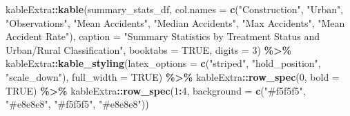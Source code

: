 \documentclass[
]{article}
\newenvironment{Shaded}{\begin{snugshade}}{\end{snugshade}}
\newcommand{\AttributeTok}[1]{\textcolor[rgb]{0.13,0.29,0.53}{#1}}
\newcommand{\ConstantTok}[1]{\textcolor[rgb]{0.56,0.35,0.01}{#1}}
\newcommand{\DecValTok}[1]{\textcolor[rgb]{0.00,0.00,0.81}{#1}}
\newcommand{\FunctionTok}[1]{\textcolor[rgb]{0.13,0.29,0.53}{\textbf{#1}}}
\newcommand{\NormalTok}[1]{#1}
\newcommand{\SpecialCharTok}[1]{\textcolor[rgb]{0.81,0.36,0.00}{\textbf{#1}}}
\newcommand{\StringTok}[1]{\textcolor[rgb]{0.31,0.60,0.02}{#1}}
\begin{document}
\begin{Shaded}
\begin{Highlighting}[]
\NormalTok{kableExtra}\SpecialCharTok{::}\FunctionTok{kable}\NormalTok{(summary\_stats\_df, }
                 \AttributeTok{col.names =} \FunctionTok{c}\NormalTok{(}\StringTok{"Construction"}\NormalTok{, }\StringTok{"Urban"}\NormalTok{, }\StringTok{"Observations"}\NormalTok{, }\StringTok{"Mean Accidents"}\NormalTok{, }
                               \StringTok{"Median Accidents"}\NormalTok{, }\StringTok{"Max Accidents"}\NormalTok{, }\StringTok{"Mean Accident Rate"}\NormalTok{),}
                 \AttributeTok{caption =} \StringTok{"Summary Statistics by Treatment Status and Urban/Rural Classification"}\NormalTok{,}
                 \AttributeTok{booktabs =} \ConstantTok{TRUE}\NormalTok{,}
                 \AttributeTok{digits =} \DecValTok{3}\NormalTok{) }\SpecialCharTok{\%\textgreater{}\%}
\NormalTok{  kableExtra}\SpecialCharTok{::}\FunctionTok{kable\_styling}\NormalTok{(}\AttributeTok{latex\_options =} \FunctionTok{c}\NormalTok{(}\StringTok{"striped"}\NormalTok{, }\StringTok{"hold\_position"}\NormalTok{, }\StringTok{"scale\_down"}\NormalTok{),}
                           \AttributeTok{full\_width =} \ConstantTok{TRUE}\NormalTok{) }\SpecialCharTok{\%\textgreater{}\%}
\NormalTok{  kableExtra}\SpecialCharTok{::}\FunctionTok{row\_spec}\NormalTok{(}\DecValTok{0}\NormalTok{, }\AttributeTok{bold =} \ConstantTok{TRUE}\NormalTok{) }\SpecialCharTok{\%\textgreater{}\%}
\NormalTok{  kableExtra}\SpecialCharTok{::}\FunctionTok{row\_spec}\NormalTok{(}\DecValTok{1}\SpecialCharTok{:}\DecValTok{4}\NormalTok{, }\AttributeTok{background =} \FunctionTok{c}\NormalTok{(}\StringTok{"\#f5f5f5"}\NormalTok{, }\StringTok{"\#e8e8e8"}\NormalTok{, }\StringTok{"\#f5f5f5"}\NormalTok{, }\StringTok{"\#e8e8e8"}\NormalTok{))}
\end{Highlighting}
\end{Shaded}
\end{document}

